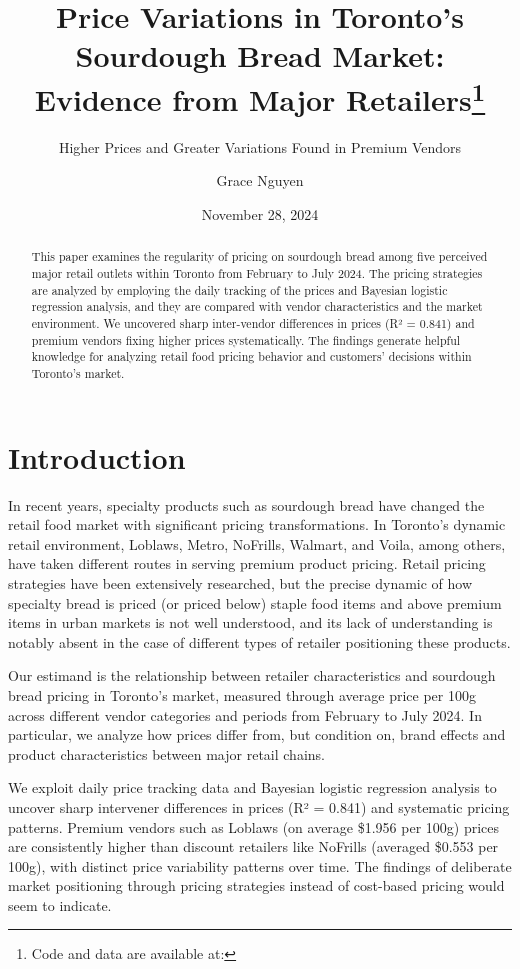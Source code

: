 \documentclass[
  letterpaper,
  DIV=11,
  numbers=noendperiod]{scrartcl}
\title{Price Variations in Toronto's Sourdough Bread Market: Evidence
from Major Retailers\thanks{Code and data are available at:}}
\subtitle{Higher Prices and Greater Variations Found in Premium Vendors}
\author{Grace Nguyen}
\date{November 28, 2024}
\begin{document}
\maketitle
\begin{abstract}
This paper examines the regularity of pricing on sourdough bread among
five perceived major retail outlets within Toronto from February to July
2024. The pricing strategies are analyzed by employing the daily
tracking of the prices and Bayesian logistic regression analysis, and
they are compared with vendor characteristics and the market
environment. We uncovered sharp inter-vendor differences in prices (R² =
0.841) and premium vendors fixing higher prices systematically. The
findings generate helpful knowledge for analyzing retail food pricing
behavior and customers' decisions within Toronto's market.
\end{abstract}


\section{Introduction}\label{introduction}

In recent years, specialty products such as sourdough bread have changed
the retail food market with significant pricing transformations. In
Toronto's dynamic retail environment, Loblaws, Metro, NoFrills, Walmart,
and Voila, among others, have taken different routes in serving premium
product pricing. Retail pricing strategies have been extensively
researched, but the precise dynamic of how specialty bread is priced (or
priced below) staple food items and above premium items in urban markets
is not well understood, and its lack of understanding is notably absent
in the case of different types of retailer positioning these products.

Our estimand is the relationship between retailer characteristics and
sourdough bread pricing in Toronto's market, measured through average
price per 100g across different vendor categories and periods from
February to July 2024. In particular, we analyze how prices differ from,
but condition on, brand effects and product characteristics between
major retail chains.

We exploit daily price tracking data and Bayesian logistic regression
analysis to uncover sharp intervener differences in prices (R² = 0.841)
and systematic pricing patterns. Premium vendors such as Loblaws (on
average \$1.956 per 100g) prices are consistently higher than discount
retailers like NoFrills (averaged \$0.553 per 100g), with distinct price
variability patterns over time. The findings of deliberate market
positioning through pricing strategies instead of cost-based pricing
would seem to indicate.
\end{document}
